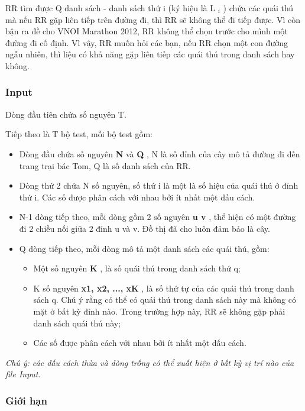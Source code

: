 RR tìm được Q danh sách - danh sách thứ i (ký hiệu là L $_ i $ ) chứa các quái thú mà nếu RR gặp liên tiếp trên đường đi, thì RR sẽ không thể đi tiếp được. Vì còn bận ra đề cho VNOI Marathon 2012, RR không thể chọn trước cho mình một đường đi cố định. Vì vậy, RR muốn hỏi các bạn, nếu RR chọn một con đường ngẫu nhiên, thì liệu có khả năng gặp liên tiếp các quái thú trong danh sách hay không.

\subsubsection{Input}

Dòng đầu tiên chứa số nguyên T.

Tiếp theo là T bộ test, mỗi bộ test gồm:
\begin{itemize}
	\item Dòng đầu chứa số nguyên \textbf{ N } và \textbf{ Q } , N là số đỉnh của cây mô tả đường đi đến trang trại bác Tom, Q là số danh sách của RR.
	\item Dòng thứ 2 chứa N số nguyên, số thứ i là một là số hiệu của quái thú ở đỉnh thứ i. Các số được phân cách với nhau bởi ít nhất một dấu cách.
	\item N-1 dòng tiếp theo, mỗi dòng gồm 2 số nguyên \textbf{ u v } , thể hiện có một đường đi 2 chiều nối giữa 2 đỉnh u và v. Đồ thị đã cho luôn đảm bảo là cây.
	\item Q dòng tiếp theo, mỗi dòng mô tả một danh sách các quái thú, gồm:
\begin{itemize}
	\item Một số nguyên \textbf{ K } , là số quái thú trong danh sách thứ q;
	\item K số nguyên \textbf{ x1, x2, ..., xK } , là số thứ tự của các quái thú trong danh sách q. Chú ý rằng có thể có quái thú trong danh sách này mà không có mặt ở bất kỳ đỉnh nào. Trong trường hợp này, RR sẽ không gặp phải danh sách quái thú này;
\end{itemize}
\begin{itemize}
	\item Các số được phân cách với nhau bởi ít nhất một dấu cách.
\end{itemize}
\end{itemize}

\emph{Chú ý: các dấu cách thừa và dòng trống có thể xuất hiện ở bất kỳ vị trí nào của file Input. }

\subsubsection{Giới hạn}

